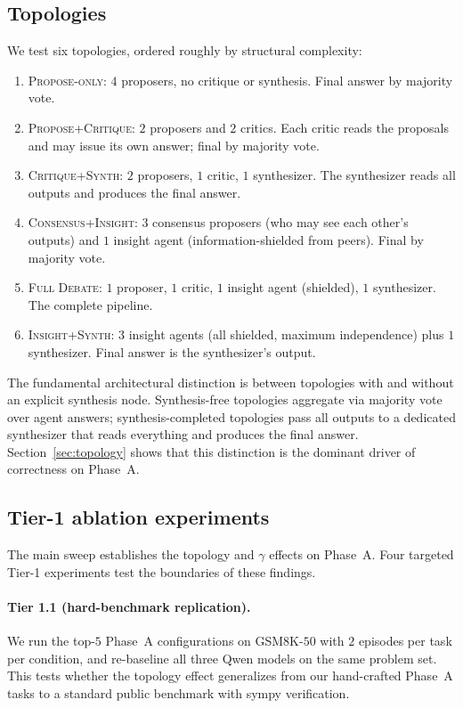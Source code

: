 \documentclass[11pt]{amsart}
\newcommand{\g}{\gamma}
\newcommand\1{{\mathds{1}}}
\theoremstyle{definition}
\theoremstyle{remark}
\numberwithin{equation}{section}
\begin{document}
\subsection{Topologies}\label{sec:topologies}

We test six topologies, ordered roughly by structural complexity:
\begin{enumerate}[leftmargin=1.4em, itemsep=2pt]
\item \textsc{Propose-only}: $4$ proposers, no critique or synthesis. Final answer by majority vote.
\item \textsc{Propose+Critique}: $2$ proposers and $2$ critics. Each critic reads the proposals and may issue its own answer; final by majority vote.
\item \textsc{Critique+Synth}: $2$ proposers, $1$ critic, $1$ synthesizer. The synthesizer reads all outputs and produces the final answer.
\item \textsc{Consensus+Insight}: $3$ consensus proposers (who may see each other's outputs) and $1$ insight agent (information-shielded from peers). Final by majority vote.
\item \textsc{Full Debate}: $1$ proposer, $1$ critic, $1$ insight agent (shielded), $1$ synthesizer. The complete pipeline.
\item \textsc{Insight+Synth}: $3$ insight agents (all shielded, maximum independence) plus $1$ synthesizer. Final answer is the synthesizer's output.
\end{enumerate}

The fundamental architectural distinction is between topologies with and without an explicit synthesis node.
Synthesis-free topologies aggregate via majority vote over agent answers; synthesis-completed topologies pass all outputs to a dedicated synthesizer that reads everything and produces the final answer.
Section~\ref{sec:topology} shows that this distinction is the dominant driver of correctness on Phase~A.

\subsection{Tier-1 ablation experiments}\label{sec:tier1}

The main sweep establishes the topology and $\g$ effects on Phase~A. Four targeted Tier-1 experiments test the boundaries of these findings.

\paragraph{Tier 1.1 (hard-benchmark replication).}
We run the top-$5$ Phase~A configurations on GSM8K-$50$ with $2$ episodes per task per condition, and re-baseline all three Qwen models on the same problem set.
This tests whether the topology effect generalizes from our hand-crafted Phase~A tasks to a standard public benchmark with sympy verification.
\end{document}
